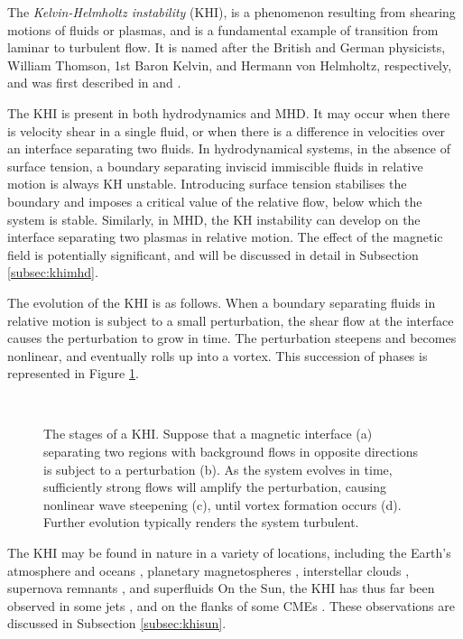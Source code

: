 The \emph{Kelvin-Helmholtz instability} (KHI), is a phenomenon resulting from shearing motions of fluids or plasmas, and is a fundamental example of transition from laminar to turbulent flow.
It is named after the British and German physicists, William Thomson, 1st Baron Kelvin, and Hermann von Helmholtz, respectively, and was first described in \cite{Helmholtz1868} and \cite{Kelvin1871}.

The KHI is present in both hydrodynamics and MHD.
It may occur when there is velocity shear in a single fluid, or when there is a difference in velocities over an interface separating two fluids.
In hydrodynamical systems, in the absence of surface tension, a boundary separating inviscid immiscible fluids in relative motion is always KH unstable.
Introducing surface tension stabilises the boundary and imposes a critical value of the relative flow, below which the system is stable.
Similarly, in MHD, the KH instability can develop on the interface separating two plasmas in relative motion.
The effect of the magnetic field is potentially significant, and will be discussed in detail in Subsection \ref{subsec:khimhd}.

The evolution of the KHI is as follows.
When a boundary separating fluids in relative motion is subject to a small perturbation, the shear flow at the interface causes the perturbation to grow in time.
The perturbation steepens and becomes nonlinear, and eventually rolls up into a vortex.
This succession of phases is represented in Figure \ref{fig:khi}.

\begin{figure}[ht]
\centering
{}
\hspace{3pt}
\\[0.3cm]
\hspace{3pt}
\caption{The stages of a KHI. Suppose that a magnetic interface (a) separating two regions with background flows in opposite directions is subject to a perturbation (b). As the system evolves in time, sufficiently strong flows will amplify the perturbation, causing nonlinear wave steepening (c), until vortex formation occurs (d). Further evolution typically renders the system turbulent.}
\label{fig:khi}
\end{figure}

The KHI may be found in nature in a variety of locations, including the Earth's atmosphere and oceans \citep{Drazin2015, Smyth2012}, planetary magnetospheres \cite{Hasegawa2004, Masters2010}, interstellar clouds \cite{Vietri1997}, supernova remnants \cite{Wang2001}, and superfluids \citep{Blaauwgeers2002}
On the Sun, the KHI has thus far been observed in some jets \citep{Kuridze2016, Bogdanova2018, Zhelyazkov2018}, and on the flanks of some CMEs \citep{Ofman2011, Foullon2011, Mostl2013}.
These observations are discussed in Subsection \ref{subsec:khisun}.

